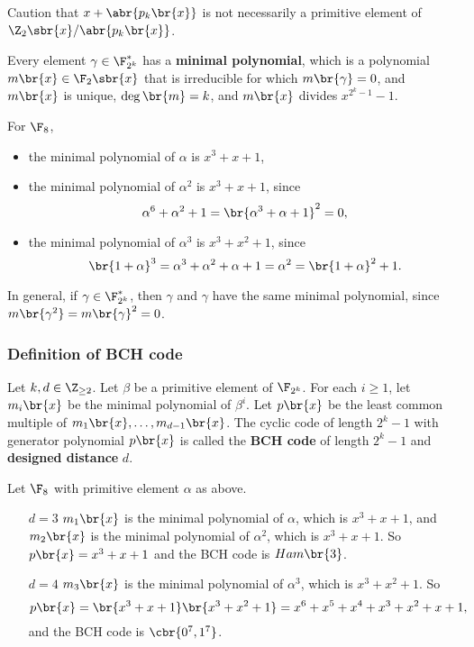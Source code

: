 Caution that $ x + \abr{p_k\br{x}} $ is not necessarily a primitive element of $ \Z_2\sbr{x} / \abr{p_k\br{x}} $.

\begin{fact*}
Every element $ \gamma \in \F_{2^k}^* $ has a \textbf{minimal polynomial}, which is a polynomial $ m\br{x} \in \F_2\sbr{x} $ that is irreducible for which $ m\br{\gamma} = 0 $, and $ m\br{x} $ is unique, $ \deg\br{m} = k $, and $ m\br{x} $ divides $ x^{2^k - 1} - 1 $.
\end{fact*}

\begin{example*}
For $ \F_8 $,
\begin{itemize}
\item the minimal polynomial of $ \alpha $ is $ x^3 + x + 1 $,
\item the minimal polynomial of $ \alpha^2 $ is $ x^3 + x + 1 $, since
$$ \alpha^6 + \alpha^2 + 1 = \br{\alpha^3 + \alpha + 1}^2 = 0, $$
\item the minimal polynomial of $ \alpha^3 $ is $ x^3 + x^2 + 1 $, since
$$ \br{1 + \alpha}^3 = \alpha^3 + \alpha^2 + \alpha + 1 = \alpha^2 = \br{1 + \alpha}^2 + 1. $$
\end{itemize}
\end{example*}

\begin{note*}
In general, if $ \gamma \in \F_{2^k}^* $, then $ \gamma $ and $ \gamma $ have the same minimal polynomial, since $ m\br{\gamma^2} = m\br{\gamma}^2 = 0 $.
\end{note*}

\pagebreak

\subsubsection{Definition of BCH code}

Let $ k, d \in \Z_{\ge 2} $. Let $ \beta $ be a primitive element of $ \F_{2^k} $. For each $ i \ge 1 $, let $ m_i\br{x} $ be the minimal polynomial of $ \beta^i $. Let $ p\br{x} $ be the least common multiple of $ m_1\br{x}, \dots, m_{d - 1}\br{x} $. The cyclic code of length $ 2^k - 1 $ with generator polynomial $ p\br{x} $ is called the \textbf{BCH code} of length $ 2^k - 1 $ and \textbf{designed distance} $ d $.

\begin{example*}
Let $ \F_8 $ with primitive element $ \alpha $ as above.
\begin{itemize}
\item[$ d = 3 $] $ m_1\br{x} $ is the minimal polynomial of $ \alpha $, which is $ x^3 + x + 1 $, and $ m_2\br{x} $ is the minimal polynomial of $ \alpha^2 $, which is $ x^3 + x + 1 $. So $ p\br{x} = x^3 + x + 1 $ and the BCH code is $ Ham\br{3} $.
\item[$ d = 4 $] $ m_3\br{x} $ is the minimal polynomial of $ \alpha^3 $, which is $ x^3 + x^2 + 1 $. So
$$ p\br{x} = \br{x^3 + x + 1}\br{x^3 + x^2 + 1} = x^6 + x^5 + x^4 + x^3 + x^2 + x + 1, $$
and the BCH code is $ \cbr{0^7, 1^7} $.
\end{itemize}
\end{example*}


